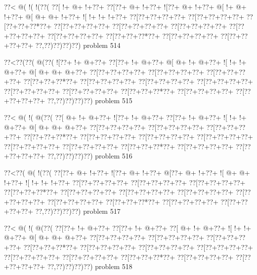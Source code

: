 \vbox{\vbox{\goo
\0??<\- @(\- !(\- !(\0??(
\0??[\- !+\- @+\- !+\0??+
\0??[\0??+\- @+\- !+\0??+
\- ![\0??+\- @+\- !+\0??+
\- @[\- !+\- @+\- !+\0??+
\- @[\- @+\- @+\- !+\0??+
\- ![\- !+\- !+\- !+\0??+
\0??[\0??+\0??+\0??+\0??+
\0??[\0??+\0??+\0??+\0??+
\0??[\0??+\0??+\0??*\0??+
\0??[\0??+\0??+\0??+\0??+
\0??[\0??+\0??+\0??+\0??+
\0??[\0??+\0??+\0??+\0??+
\0??[\0??+\0??+\0??+\0??+
\0??[\0??+\0??+\0??+\0??+
\0??[\0??+\0??+\0??*\0??+
\0??[\0??+\0??+\0??+\0??+
\0??[\0??+\0??+\0??+\0??+
\0??,\0??)\0??)\0??)\0??)
}
\hfil problem 514\hfil\break
}

\vbox{\vbox{\goo
\0??<\0??(\0??(\- @(\0??(
\- ![\0??+\- !+\- @+\0??+
\0??[\0??+\- !+\- @+\0??+
\- @[\- @+\- !+\- @+\0??+
\- ![\- !+\- !+\- @+\0??+
\- @[\- @+\- @+\- @+\0??+
\0??[\0??+\0??+\0??+\0??+
\0??[\0??+\0??+\0??+\0??+
\0??[\0??+\0??+\0??+\0??+
\0??[\0??+\0??+\0??*\0??+
\0??[\0??+\0??+\0??+\0??+
\0??[\0??+\0??+\0??+\0??+
\0??[\0??+\0??+\0??+\0??+
\0??[\0??+\0??+\0??+\0??+
\0??[\0??+\0??+\0??+\0??+
\0??[\0??+\0??+\0??*\0??+
\0??[\0??+\0??+\0??+\0??+
\0??[\0??+\0??+\0??+\0??+
\0??,\0??)\0??)\0??)\0??)
}
\hfil problem 515\hfil\break
}

\vbox{\vbox{\goo
\0??<\- @(\- !(\- @(\0??(
\0??[\- @+\- !+\- @+\0??+
\- ![\0??+\- !+\- @+\0??+
\0??[\0??+\- !+\- @+\0??+
\- ![\- !+\- !+\- @+\0??+
\- @[\- @+\- @+\- @+\0??+
\0??[\0??+\0??+\0??+\0??+
\0??[\0??+\0??+\0??+\0??+
\0??[\0??+\0??+\0??+\0??+
\0??[\0??+\0??+\0??*\0??+
\0??[\0??+\0??+\0??+\0??+
\0??[\0??+\0??+\0??+\0??+
\0??[\0??+\0??+\0??+\0??+
\0??[\0??+\0??+\0??+\0??+
\0??[\0??+\0??+\0??+\0??+
\0??[\0??+\0??+\0??*\0??+
\0??[\0??+\0??+\0??+\0??+
\0??[\0??+\0??+\0??+\0??+
\0??,\0??)\0??)\0??)\0??)
}
\hfil problem 516\hfil\break
}

\vbox{\vbox{\goo
\0??<\0??(\- @(\- !(\0??(
\0??[\0??+\- @+\- !+\0??+
\- ![\0??+\- @+\- !+\0??+
\- @[\0??+\- @+\- !+\0??+
\- ![\- @+\- @+\- !+\0??+
\- ![\- !+\- !+\- !+\0??+
\0??[\0??+\0??+\0??+\0??+
\0??[\0??+\0??+\0??+\0??+
\0??[\0??+\0??+\0??+\0??+
\0??[\0??+\0??+\0??*\0??+
\0??[\0??+\0??+\0??+\0??+
\0??[\0??+\0??+\0??+\0??+
\0??[\0??+\0??+\0??+\0??+
\0??[\0??+\0??+\0??+\0??+
\0??[\0??+\0??+\0??+\0??+
\0??[\0??+\0??+\0??*\0??+
\0??[\0??+\0??+\0??+\0??+
\0??[\0??+\0??+\0??+\0??+
\0??,\0??)\0??)\0??)\0??)
}
\hfil problem 517\hfil\break
}

\vbox{\vbox{\goo
\0??<\- @(\- !(\- @(\0??(
\0??[\0??+\- !+\- @+\0??+
\0??[\0??+\- !+\- @+\0??+
\0??[\- @+\- !+\- @+\0??+
\- ![\- !+\- !+\- @+\0??+
\- @[\- @+\- @+\- @+\0??+
\0??[\0??+\0??+\0??+\0??+
\0??[\0??+\0??+\0??+\0??+
\0??[\0??+\0??+\0??+\0??+
\0??[\0??+\0??+\0??*\0??+
\0??[\0??+\0??+\0??+\0??+
\0??[\0??+\0??+\0??+\0??+
\0??[\0??+\0??+\0??+\0??+
\0??[\0??+\0??+\0??+\0??+
\0??[\0??+\0??+\0??+\0??+
\0??[\0??+\0??+\0??*\0??+
\0??[\0??+\0??+\0??+\0??+
\0??[\0??+\0??+\0??+\0??+
\0??,\0??)\0??)\0??)\0??)
}
\hfil problem 518\hfil\break
}

